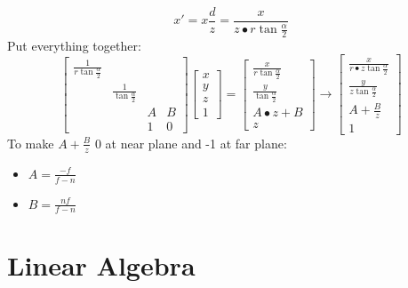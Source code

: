 \documentclass[12pt]{article}
\begin{document}
    \[
        x'=x\frac{d}{z}=\frac{x}{z\bullet r\tan{\frac{\alpha}{2}}}
    \]
    Put everything together:
    \[
        \left[ \begin{array}{cccc}
            \frac{1}{r\tan{\frac{\alpha}{2}}} & & & \\
            & \frac{1}{\tan{\frac{\alpha}{2}}} & & \\
            & & A & B \\
            & & 1 & 0
        \end{array} \right]
        \left[ \begin{array}{c}
            x \\
            y \\
            z \\
            1
        \end{array} \right]
        =
        \left[ \begin{array}{c}
            \frac{x}{r\tan{\frac{\alpha}{2}}} \\
            \frac{y}{\tan{\frac{\alpha}{2}}} \\
            A\bullet z+B \\
            z
        \end{array} \right]
        \to
        \left[ \begin{array}{c}
            \frac{x}{r\bullet z\tan{\frac{\alpha}{2}}} \\
            \frac{y}{z\tan{\frac{\alpha}{2}}} \\
            A+\frac{B}{z} \\
            1
        \end{array} \right]
    \]
    To make \(A+\frac{B}{z}\) 0 at near plane and -1 at far plane:
    \begin{itemize}
        \item \(A=\frac{-f}{f-n}\)
        \item \(B=\frac{nf}{f-n}\)
    \end{itemize}
    
\section{Linear Algebra}
\end{document}
